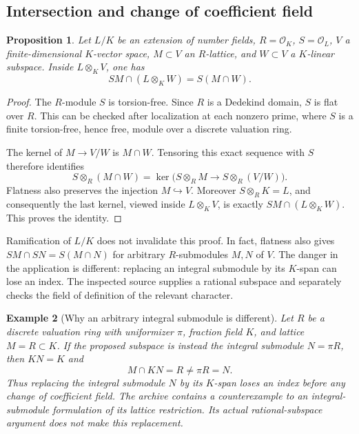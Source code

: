 \documentclass[11pt,a4paper]{article}
\newtheorem{proposition}{Proposition}[section]
\newtheorem{example}[proposition]{Example}
\theoremstyle{remark}
\newcommand{\OO}{\mathcal O}
\newcommand{\src}[1]{\cite{#1}}
\begin{document}
\subsection{Intersection and change of coefficient field}
\begin{proposition}\label{prop:flat}
Let $L/K$ be an extension of number fields, $R=\OO_K$, $S=\OO_L$, $V$ a finite-dimensional $K$-vector space, $M\subset V$ an $R$-lattice, and $W\subset V$ a $K$-linear subspace. Inside $L\otimes_K V$, one has
\[
 SM\cap (L\otimes_K W)=S(M\cap W).
\]
\end{proposition}
\begin{proof}
The $R$-module $S$ is torsion-free. Since $R$ is a Dedekind domain, $S$ is flat over $R$. This can be checked after localization at each nonzero prime, where $S$ is a finite torsion-free, hence free, module over a discrete valuation ring.

The kernel of $M\to V/W$ is $M\cap W$. Tensoring this exact sequence with $S$ therefore identifies
\[
 S\otimes_R(M\cap W)
 =
 \ker\bigl(S\otimes_R M\longrightarrow S\otimes_R(V/W)\bigr).
\]
Flatness also preserves the injection $M\hookrightarrow V$. Moreover
$S\otimes_R K=L$, and consequently the last kernel, viewed inside
$L\otimes_K V$, is exactly
$SM\cap(L\otimes_K W)$. This proves the identity.
\end{proof}
Ramification of $L/K$ does not invalidate this proof. In fact, flatness also gives $SM\cap SN=S(M\cap N)$ for arbitrary $R$-submodules $M,N$ of $V$. The danger in the application is different: replacing an integral submodule by its $K$-span can lose an index. The inspected source supplies a rational subspace and separately checks the field of definition of the relevant character. \src{S-rational}

\begin{example}[Why an arbitrary integral submodule is different]
Let $R$ be a discrete valuation ring with uniformizer $\pi$, fraction field $K$, and lattice $M=R\subset K$. If the proposed subspace is instead the integral submodule $N=\pi R$, then $KN=K$ and
\[
 M\cap KN=R\ne\pi R=N.
\]
Thus replacing the integral submodule $N$ by its $K$-span loses an index before any change of coefficient field. The archive contains a counterexample to an integral-submodule formulation of its lattice restriction. Its actual rational-subspace argument does not make this replacement.
\end{example}
\end{document}
